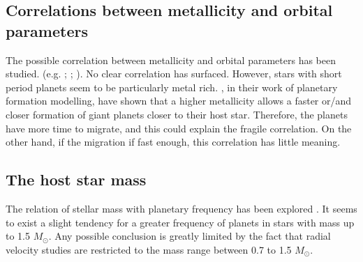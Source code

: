 \documentclass[dvips,12pt,a4paper]{report}
\begin{document}
{%


\subsection {Correlations between metallicity and orbital parameters}

The possible correlation between metallicity and orbital parameters has been studied. (e.g. \citet{Gonzalez-1998}; \citet{Santos-2003}; \citet {Fischer-2005}). No clear correlation has surfaced. However, stars with short period planets seem to be particularly metal rich. \citet{Ida-2004b}, in their work of planetary formation modelling, have shown that a higher metallicity allows a faster or/and closer formation of giant planets closer to their host star. Therefore, the planets have more time to migrate, and this could explain the fragile correlation.  On the other hand, if the migration if fast enough, this correlation has little meaning.

\subsection {The host star mass}

The relation of stellar mass with planetary frequency has been explored \citep{Laws-2003}. It seems to exist a slight tendency for a greater frequency of planets in stars with mass up to  1.5 $M_\odot$. Any possible conclusion is greatly limited by the fact that radial velocity studies are restricted to the mass range between 0.7 to 1.5 $M_\odot$. 

}
\end{document}
